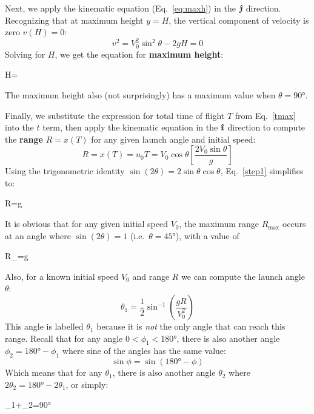 Next, we apply the kinematic equation (Eq.~\ref{eq:maxh}) in the $\bm{\hat\jmath}$
direction. Recognizing that at maximum height $y=H$, the vertical component of
velocity is zero $v(H)=0$:
\begin{equation*}
  v^2 = V_0^2\sin^2\theta-2gH = 0
\end{equation*}
Solving for $H$, we get the equation for \textbf{maximum height}:
\begin{important-equation}
  H=
\end{important-equation}
The maximum height also (not surprisingly) has a maximum value when
$\theta=\ang{90}$.

Finally, we substitute the expression for total time of flight $T$ from
Eq.~\ref{tmax} into the $t$ term, then apply the kinematic equation in the
$\bm{\hat\imath}$ direction to compute the \textbf{range} $R=x(T)$ for any given launch
angle and initial speed:
\begin{equation}
  R=x(T)=u_0T=V_0\cos\theta\left[\frac{2V_0\sin\theta}g\right]
  \label{step1}
\end{equation}
Using the trigonometric identity $\sin(2\theta)=2\sin\theta\cos\theta$,
Eq.~\ref{step1} simplifies to:
\begin{important-equation}
  R=g
\end{important-equation}
It is obvious that for any given initial speed $V_0$, the maximum range
$R_\text{max}$ occurs at an angle where $\sin(2\theta)=1$ (i.e.\
$\theta=\ang{45}$), with a value of
\begin{important-equation}
  R_=g
\end{important-equation}
Also, for a known initial speed $V_0$ and range $R$ we can compute the launch
angle $\theta$:
\begin{displaymath}
  \theta_1=\frac12\sin^{-1}\left(\frac{gR}{V_0^2}\right)
\end{displaymath}
This angle is labelled $\theta_1$ because it is \emph{not} the only angle that
can reach this range. Recall that for any angle $0<\phi_1<\ang{180}$, there
is also another angle $\phi_2=\ang{180}-\phi_1$ where sine of the angles has the
same value:
\begin{displaymath}
  \sin\phi=\sin(\ang{180}-\phi)
\end{displaymath}
Which means that for any $\theta_1$, there is also another angle $\theta_2$
where $2\theta_2=\ang{180}-2\theta_1$, or simply:
\begin{important-equation}
  \theta_1+\theta_2=\ang{90}
\end{important-equation}
